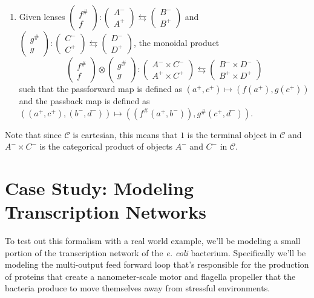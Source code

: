 \documentclass[12pt]{article}
\newcounter{examp}
\begin{document}
\begin{definition*}{}{}
\begin{enumerate}
        \item Given lenses $\begin{pmatrix}f^{\#}\\f\end{pmatrix}:\begin{pmatrix}A^-\\A^+\end{pmatrix}\leftrightarrows\begin{pmatrix}B^-\\B^+\end{pmatrix}$
              and $\begin{pmatrix}g^{\#}\\g\end{pmatrix}:\begin{pmatrix}C^-\\C^+\end{pmatrix}\leftrightarrows\begin{pmatrix}D^-\\D^+\end{pmatrix}$, the monoidal product
              $$\begin{pmatrix}f^{\#}\\f\end{pmatrix} \otimes \begin{pmatrix}g^{\#}\\g\end{pmatrix}:\begin{pmatrix}A^- \times C^-\\A^+ \times C^+\end{pmatrix}\leftrightarrows\begin{pmatrix}B^- \times D^-\\B^+ \times D^+\end{pmatrix}$$
              such that the passforward map is defined as $(a^+, c^+) \mapsto (f(a^+), g(c^+))$ and the passback map is defined as $((a^+, c^+), (b^-, d^-)) \mapsto ((f^\#(a^+, b^-)), g^\#(c^+, d^-))$.
    \end{enumerate}

    Note that since $\mathcal{C}$ is cartesian, this means that $1$ is the terminal object in $\mathcal{C}$ and $A^- \times C^-$ is the categorical product of objects $A^-$ and $C^-$ in $\mathcal{C}$.
\end{definition*}





\section*{Case Study: Modeling Transcription Networks}
To test out this formalism with a real world example, we'll be modeling a small portion of the transcription network of the \textit{e. coli} bacterium.
Specifically we'll be modeling the multi-output feed forward loop that's responsible for the production of proteins that create a nanometer-scale motor and flagella propeller that the bacteria produce to move themselves away from stressful environments.
\end{document}
